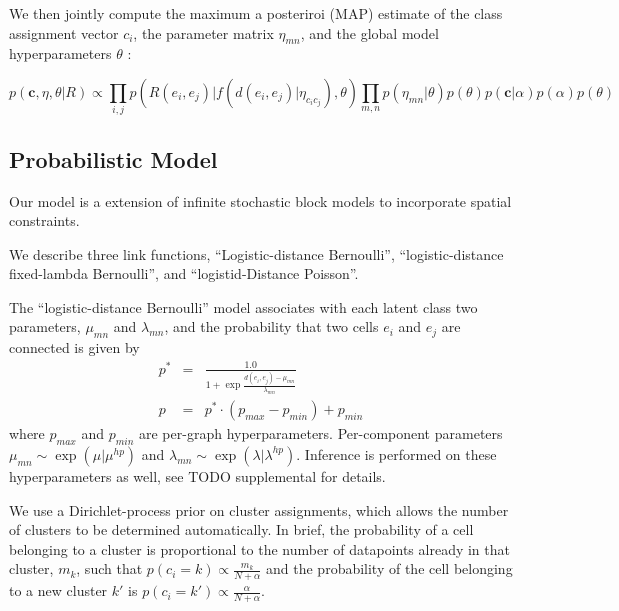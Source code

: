 \documentclass{article}
\renewcommand{\vec}[1]{\mathbf{#1}}
\begin{document}
We then jointly compute the maximum a posteriroi (MAP) estimate of the
class assignment vector ${c_i}$, the parameter matrix $\eta_{mn}$, and
the global model hyperparameters $\theta$ :

\begin{equation}
  p(\vec{c}, \eta, \theta | R ) \propto \prod_{i, j} p(R(e_i, e_j) | f(d(e_i, e_j) | \eta_{c_ic_j}), \theta) \prod_{m, n} p(\eta_{mn} | \theta)  p(\theta) p(\vec{c} | \alpha) p(\alpha) p(\theta)
\end{equation}



\subsection{Probabilistic Model}

Our model is a extension of infinite stochastic block models
\autocite{Kemp2006a, other guys} to incorporate spatial constraints.


We describe three link functions, ``Logistic-distance Bernoulli'',
``logistic-distance fixed-lambda Bernoulli'', and ``logistid-Distance
Poisson''. 

The ``logistic-distance Bernoulli'' model associates with each latent class 
two parameters, $\mu_{mn}$ and $\lambda_{mn}$, and the probability that two
cells $e_i$ and $e_j$ are connected is given by
\begin{eqnarray}
p^* &=& \frac{1.0}{1 + \exp \frac{d(e_i, e_j) - \mu_{mn}}{\lambda_{mn}}}\\
p &= & p^* \cdot (p_{max} - p_{min}) + p_{min}
\end{eqnarray}
where $p_{max}$ and $p_{min}$ are per-graph hyperparameters. Per-component parameters $\mu_{mn} \sim \exp(\mu | \mu^{hp})$ and $\lambda_{mn} \sim \exp(\lambda | \lambda^{hp})$. 
Inference is performed on these hyperparameters as well, see TODO supplemental 
for details. 

We use a Dirichlet-process prior on cluster assignments, which allows
the number of clusters to be determined automatically. In brief, the
probability of a cell belonging to a cluster is proportional to the
number of datapoints already in that cluster, $m_k$, such that $p(c_i
= k) \propto \frac{m_k}{N + \alpha}$ and the probability of the cell
belonging to a new cluster $k'$ is $p(c_i = k') \propto
\frac{\alpha}{N + \alpha}$.
\end{document}
